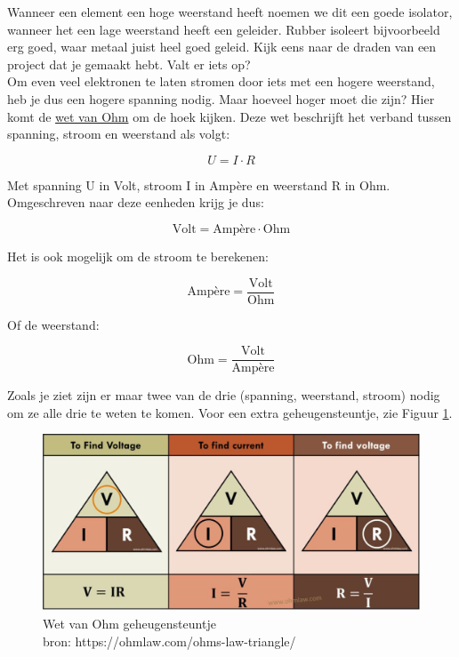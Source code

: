 Wanneer een element een hoge weerstand heeft noemen we dit een goede isolator, wanneer het een lage weerstand heeft een geleider. Rubber isoleert bijvoorbeeld erg goed, waar metaal juist heel goed geleid. Kijk eens naar de draden van een project dat je gemaakt hebt. Valt er iets op? \\

Om even veel elektronen te laten stromen door iets met een hogere weerstand, heb je dus een hogere spanning nodig. Maar hoeveel hoger moet die zijn? Hier komt de \href{https://nl.wikipedia.org/wiki/Wet_van_Ohm}{wet van Ohm} om de hoek kijken. Deze wet beschrijft het verband tussen spanning, stroom en weerstand als volgt:

\begin{equation}
	U = I \cdot R
\end{equation}

Met spanning U in Volt, stroom I in Ampère en weerstand R in Ohm. Omgeschreven naar deze eenheden krijg je dus:

\begin{equation}
	\text{Volt} = \text{Ampère} \cdot \text{Ohm}
	\label{eq:ohmslaw_volt_unknown}
\end{equation}

Het is ook mogelijk om de stroom te berekenen:

\begin{equation}
	\text{Ampère} = \frac{\text{Volt}}{\text{Ohm}}
	\label{eq:ohmslaw_ampere_unknown}
\end{equation}

Of de weerstand:

\begin{equation}
	\text{Ohm} = \frac{\text{Volt}}{\text{Ampère}}	
	\label{eq:ohmslaw_ohm_unknown}
\end{equation}

Zoals je ziet zijn er maar twee van de drie (spanning, weerstand, stroom) nodig om ze alle drie te weten te komen. Voor een extra geheugensteuntje, zie Figuur \ref{fig:ohmslawtriangle}. 

\begin{figure}[H]
	\includegraphics[scale=0.3]{./img/ohms_law_triangle.jpg}
	\centering 
	\caption[caption]{Wet van Ohm geheugensteuntje \\\hspace{\textwidth} bron: https://ohmlaw.com/ohms-law-triangle/}
	\label{fig:ohmslawtriangle}
\end{figure}

